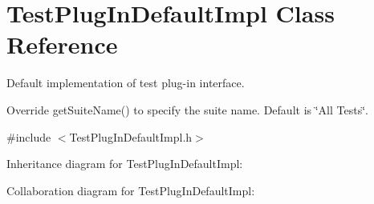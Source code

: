 \hypertarget{class_test_plug_in_default_impl}{\section{Test\+Plug\+In\+Default\+Impl Class Reference}
\label{class_test_plug_in_default_impl}
}


Default implementation of test plug-\/in interface.

Override get\+Suite\+Name() to specify the suite name. Default is \char`\"{}\+All Tests\char`\"{}.  




{\ttfamily \#include $<$Test\+Plug\+In\+Default\+Impl.\+h$>$}



Inheritance diagram for Test\+Plug\+In\+Default\+Impl\+:


Collaboration diagram for Test\+Plug\+In\+Default\+Impl\+:
